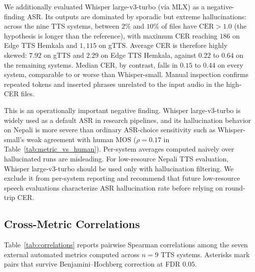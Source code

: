 \documentclass[11pt]{article}
\begin{document}
We additionally evaluated Whisper large-v3-turbo (via MLX) as a negative-finding ASR. Its outputs are dominated by sporadic but extreme hallucinations: across the nine TTS systems, between $2\%$ and $10\%$ of files have $\text{CER} > 1.0$ (the hypothesis is longer than the reference), with maximum CER reaching $186$ on Edge TTS Hemkala and $1{,}115$ on gTTS. Average CER is therefore highly skewed: $7.92$ on gTTS and $2.29$ on Edge TTS Hemkala, against $0.22$ to $0.64$ on the remaining systems. Median CER, by contrast, falls in $0.15$ to $0.44$ on every system, comparable to or worse than Whisper-small. Manual inspection confirms repeated tokens and inserted phrases unrelated to the input audio in the high-CER files.

This is an operationally important negative finding. Whisper large-v3-turbo is widely used as a default ASR in research pipelines, and its hallucination behavior on Nepali is more severe than ordinary ASR-choice sensitivity such as Whisper-small's weak agreement with human MOS ($\rho = 0.17$ in Table~\ref{tab:metric_vs_human}). Per-system averages computed naively over hallucinated runs are misleading. For low-resource Nepali TTS evaluation, Whisper large-v3-turbo should be used only with hallucination filtering. We exclude it from per-system reporting and recommend that future low-resource speech evaluations characterize ASR hallucination rate before relying on round-trip CER.

\subsection{Cross-Metric Correlations}

Table~\ref{tab:correlations} reports pairwise Spearman correlations among the seven external automated metrics computed across $n = 9$ TTS systems. Asterisks mark pairs that survive Benjamini--Hochberg correction at FDR $0.05$.
\end{document}
